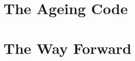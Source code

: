 \documentclass{beamer}
\begin{document}
\section{The Ageing Code}

\section{The Way Forward}
\end{document}
